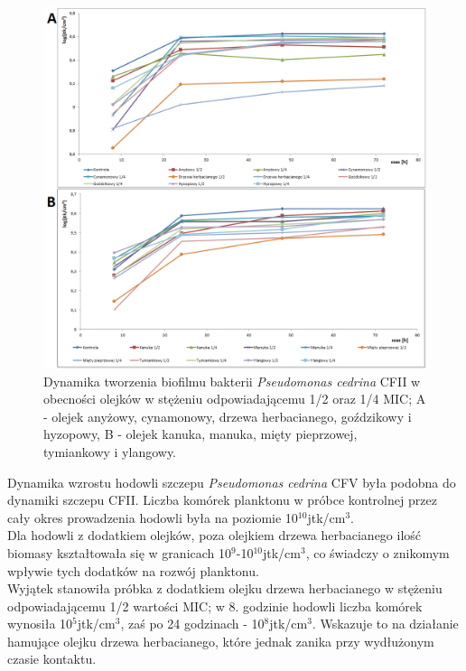 \documentclass[11pt,a4paper]{report}
\begin{document}
\begin{figure}[!h]
\begin{center}
\includegraphics[scale=0.50]{img/cfii-c.png}
\caption{Dynamika tworzenia biofilmu bakterii \textit{Pseudomonas cedrina} CFII w obecności olejków w stężeniu odpowiadającemu 1/2 oraz 1/4 MIC; A - olejek anyżowy, cynamonowy, drzewa herbacianego, goździkowy i hyzopowy, B - olejek kanuka, manuka, mięty pieprzowej, tymiankowy i ylangowy.}\label{cfii-c}
\end{center} 
\end{figure}

\clearpage

Dynamika wzrostu hodowli szczepu \textit{Pseudomonas cedrina} CFV była podobna do dynamiki szczepu CFII. Liczba komórek planktonu w próbce kontrolnej przez cały okres prowadzenia hodowli była na poziomie 10$^10$jtk/cm$^3$.\\
Dla hodowli z dodatkiem olejków, poza olejkiem drzewa herbacianego ilość biomasy kształtowała się w granicach 10$^9$-10$^10$jtk/cm$^3$, co świadczy o znikomym wpływie tych dodatków na rozwój planktonu.\\
Wyjątek stanowiła próbka z dodatkiem olejku drzewa herbacianego w stężeniu odpowiadającemu 1/2 wartości MIC; w 8. godzinie hodowli liczba komórek wynosiła 10$^5$jtk/cm$^3$, zaś po 24 godzinach - 10$^8$jtk/cm$^3$. Wskazuje to na działanie hamujące olejku drzewa herbacianego, które jednak zanika przy wydłużonym czasie kontaktu.
\end{document}
